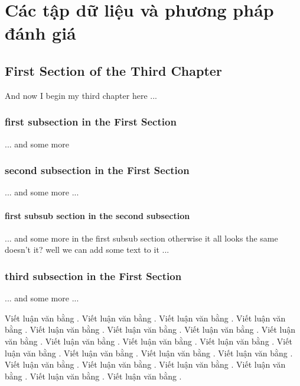 \chapter{Các tập dữ liệu và phương pháp đánh giá}
\ifpdf
    \graphicspath{{Chapter3/Chapter3Figs/PNG/}{Chapter3/Chapter3Figs/PDF/}{Chapter3/Chapter3Figs/}}
\else
    \graphicspath{{Chapter3/Chapter3Figs/EPS/}{Chapter3/Chapter3Figs/}}
\fi

\section{First Section of the Third Chapter}
And now I begin my third chapter here ...

\subsection{first subsection in the First Section}
... and some more 

\subsection{second subsection in the First Section}
... and some more ...

\subsubsection{first subsub section in the second subsection}
... and some more in the first subsub section otherwise it all looks the same
doesn't it? well we can add some text to it ...

\subsection{third subsection in the First Section}
... and some more ...

  Viết luận văn bằng  . Viết luận văn bằng  . Viết luận văn bằng  . Viết luận văn bằng  . Viết luận văn bằng  . Viết luận văn bằng  . Viết luận văn bằng  . Viết luận văn bằng  . Viết luận văn bằng  . Viết luận văn bằng  . Viết luận văn bằng  . Viết luận văn bằng  . Viết luận văn bằng  . Viết luận văn bằng  . Viết luận văn bằng  . Viết luận văn bằng  . Viết luận văn bằng  . Viết luận văn bằng  . Viết luận văn bằng  . Viết luận văn bằng  . Viết luận văn bằng  . 
  
